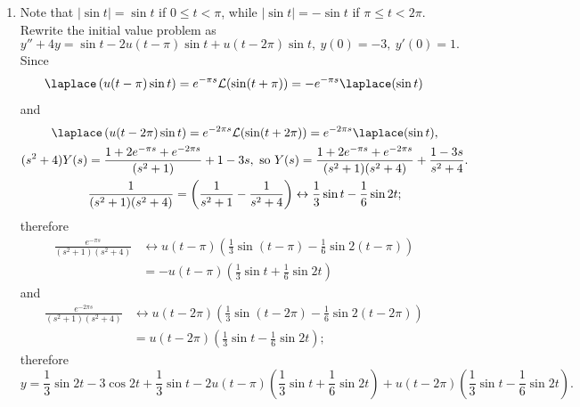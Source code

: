 \documentclass[openany]{book}
\newenvironment{sectionSolutions}{
 \begin{enumerate}[item-label={\thesection.\arabic{enumi}.}]
}{
 \end{enumerate}
}
\begin{document}
\begin{sectionSolutions}
\item
Note that $|\sin t|=\sin t$ if $0\le t<\pi$, while
 $|\sin t|=-\sin t$ if $\pi\le t<2\pi$. Rewrite the initial value
problem as
\[
y''+4y=\sin t-2u(t-\pi)\sin t+u(t-2\pi)\sin t,\ y(0)=-3,\ y'(0)=1.
\]
Since
\[
\laplace \left(u(t-\pi)\sin t\right)=e^{-\pi s}{\cal
L}(\sin(t+\pi))=-e^{-\pi s}\laplace (\sin t)
\]
 and
\begin{gather*}
\laplace \left(u(t-2\pi)\sin t\right)=e^{-2\pi s}{\cal
L}(\sin(t+2\pi))=e^{-2\pi s}\laplace (\sin t),
\\
(s^2+4)Y(s)=\frac{1+2e^{-\pi s}+e^{-2\pi s}}{(s^2+1)}+1-3s,\text{ so }
Y(s)=\frac{1+2e^{-\pi s}+e^{-2\pi
s}}{(s^2+1)(s^2+4)}+\frac{1-3s}{ s^2+4}.
\\
\frac{1}{(s^2+1)(s^2+4)}=\left(\frac{1}{ s^2+1}-\frac{1}{ s^2+4}\right)
\leftrightarrow \frac{1}{3}\sin t-\frac{1}{6}\sin2t;
\end{gather*}
therefore
\begin{align*}
\frac{e^{-\pi s}}{(s^2+1)(s^2+4)}
&\leftrightarrow
u(t-\pi)\left(\frac{1}{3}\sin(t-\pi)-\frac{1}{6}\sin2(t-\pi)\right)\\
&=-u(t-\pi)\left(\frac{1}{3}\sin t+\frac{1}{6}\sin2t\right)
\end{align*}
and
\begin{align*}
\frac{e^{-2\pi s}}{(s^2+1)(s^2+4)}
&\leftrightarrow
u(t-2\pi)\left(\frac{1}{3}\sin(t-2\pi)-\frac{1}{6}\sin2(t-2\pi)\right)\\
&=u(t-2\pi)\left(\frac{1}{3}\sin t-\frac{1}{6}\sin2t\right);
\end{align*}
therefore
\[
y=\frac{1}{3}\sin2t-3\cos2t+\frac{1}{3}\sin t
- 2 u(t-\pi)\left(\frac{1}{3}\sin t+\frac{1}{6}\sin2t\right)
+u(t-2\pi)\left(\frac{1}{3}\sin
t-\frac{1}{6}\sin2t\right).
\]



\end{sectionSolutions}
\end{document}
